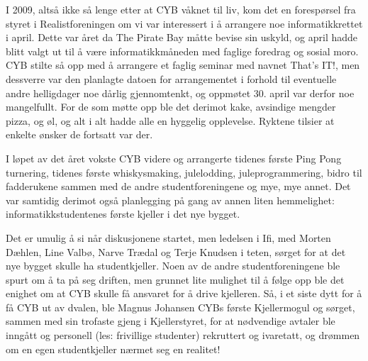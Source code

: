 I 2009, altså ikke så lenge etter at CYB våknet til liv, kom det en forespørsel fra styret i Realistforeningen om vi var interessert i å arrangere noe informatikkrettet i april. Dette var året da The Pirate Bay måtte bevise sin uskyld, og april hadde blitt valgt ut til å være informatikkmåneden med faglige foredrag og sosial moro. CYB stilte så opp med å arrangere et faglig seminar med navnet That’s IT!, men dessverre var den planlagte datoen for arrangementet i forhold til eventuelle andre helligdager noe dårlig gjennomtenkt, og oppmøtet 30. april var derfor noe mangelfullt. For de som møtte opp ble det derimot kake, avsindige mengder pizza, og øl, og alt i alt hadde alle en hyggelig opplevelse. Ryktene tilsier at enkelte ønsker de fortsatt var der.

I løpet av det året vokste CYB videre og arrangerte tidenes første Ping Pong turnering, tidenes første whiskysmaking, julelodding, juleprogrammering, bidro til fadderukene sammen med de andre studentforeningene og mye, mye annet. Det var samtidig derimot også planlegging på gang av annen liten hemmelighet: informatikkstudentenes første kjeller i det nye bygget.

Det er umulig å si når diskusjonene startet, men ledelsen i Ifi, med Morten Dæhlen, Line Valbø, Narve Trædal og Terje Knudsen i teten, sørget for at det nye bygget skulle ha studentkjeller. Noen av de andre studentforeningene ble spurt om å ta på seg driften, men grunnet lite mulighet til å følge opp ble det enighet om at CYB skulle få ansvaret for å drive kjelleren. Så, i et siste dytt for å få CYB ut av dvalen, ble Magnus Johansen CYBs første Kjellermogul og sørget, sammen med sin trofaste gjeng i Kjellerstyret, for at nødvendige avtaler ble inngått og personell (les: frivillige studenter) rekruttert og ivaretatt, og drømmen om en egen studentkjeller nærmet seg en realitet!
